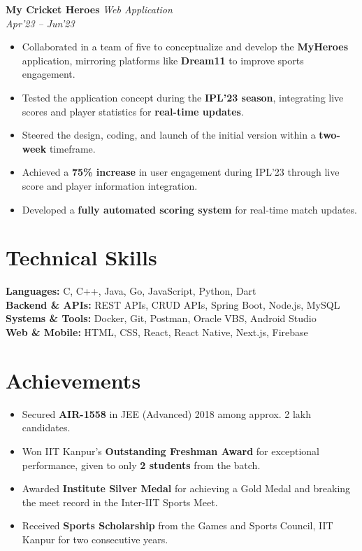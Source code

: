 \documentclass[10pt,a4paper]{article}
\newcommand{\resumeItem}[1]{\item[\textcolor{primary}{\textbullet}] #1}
\newcommand{\skillCategory}[2]{\textbf{#1:} #2}
\begin{document}
\vspace{1pt}
\textbf{My Cricket Heroes} \hfill \textit{Web Application}\\
\textit{Apr'23 -- Jun'23}
\begin{itemize}[leftmargin=1.05em, nosep, topsep=0pt, itemsep=0pt, parsep=0pt]
    \resumeItem{Collaborated in a team of five to conceptualize and develop the \textbf{MyHeroes} application, mirroring platforms like \textbf{Dream11} to improve sports engagement.}
    \resumeItem{Tested the application concept during the \textbf{IPL'23 season}, integrating live scores and player statistics for \textbf{real-time updates}.}
    \resumeItem{Steered the design, coding, and launch of the initial version within a \textbf{two-week} timeframe.}
    \resumeItem{Achieved a \textbf{75\% increase} in user engagement during IPL'23 through live score and player information integration.}
    \resumeItem{Developed a \textbf{fully automated scoring system} for real-time match updates.}
\end{itemize}

\section{Technical Skills}
\small
\skillCategory{Languages}{C, C++, Java, Go, JavaScript, Python, Dart}\\[1pt]
\skillCategory{Backend \& APIs}{REST APIs, CRUD APIs, Spring Boot, Node.js, MySQL}\\[1pt]
\skillCategory{Systems \& Tools}{Docker, Git, Postman, Oracle VBS, Android Studio}\\[1pt]
\skillCategory{Web \& Mobile}{HTML, CSS, React, React Native, Next.js, Firebase}

\section{Achievements}
\small
\begin{itemize}[leftmargin=1.05em, nosep, topsep=0pt, itemsep=0pt, parsep=0pt]
    \resumeItem{Secured \textbf{AIR-1558} in JEE (Advanced) 2018 among approx. 2 lakh candidates.}
\resumeItem{Won IIT Kanpur's \textbf{Outstanding Freshman Award} for exceptional performance, given to only \textbf{2 students} from the batch.}
    \resumeItem{Awarded \textbf{Institute Silver Medal} for achieving a Gold Medal and breaking the meet record in the Inter-IIT Sports Meet.}
    \resumeItem{Received \textbf{Sports Scholarship} from the Games and Sports Council, IIT Kanpur for two consecutive years.}
\end{itemize}
\end{document}
